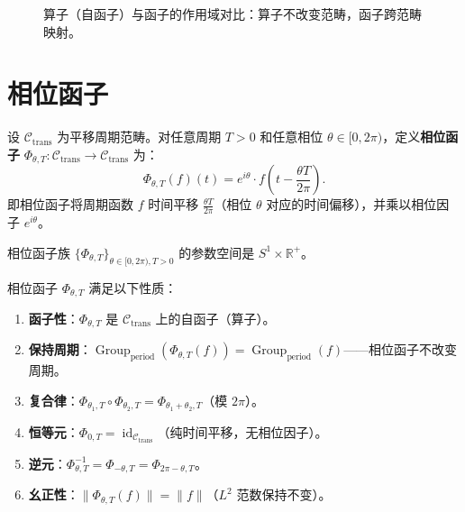 \begin{figure}[htbp]
\centering
{}
\caption{算子（自函子）与函子的作用域对比：算子不改变范畴，函子跨范畴映射。}
\label{fig:operator_vs_functor}
\end{figure}

\section{相位函子}\label{sec:phase_functor}

\begin{definition}[相位函子]\label{def:phase_functor_general}
设 $\mathcal{C}_{\text{trans}}$ 为平移周期范畴。对任意周期 $T > 0$ 和任意相位 $\theta \in [0, 2\pi)$，定义\textbf{相位函子} $\Phi_{\theta, T}: \mathcal{C}_{\text{trans}} \to \mathcal{C}_{\text{trans}}$ 为：
\[
\Phi_{\theta, T}(f)(t) = e^{i\theta} \cdot f\!\left( t - \frac{\theta T}{2\pi} \right).
\]
即相位函子将周期函数 $f$ 时间平移 $\frac{\theta T}{2\pi}$（相位 $\theta$ 对应的时间偏移），并乘以相位因子 $e^{i\theta}$。

相位函子族 $\{\Phi_{\theta, T}\}_{\theta \in [0, 2\pi), T > 0}$ 的参数空间是 $S^1 \times \mathbb{R}^+$。
\end{definition}

\begin{proposition}[相位函子的基本性质]\label{prop:phase_functor_properties}
相位函子 $\Phi_{\theta, T}$ 满足以下性质：
\begin{enumerate}[label=(\roman*)]
    \item \textbf{函子性}：$\Phi_{\theta, T}$ 是 $\mathcal{C}_{\text{trans}}$ 上的自函子（算子）。
    \item \textbf{保持周期}：$\operatorname{Group}_{\mathrm{period}}(\Phi_{\theta, T}(f)) = \operatorname{Group}_{\mathrm{period}}(f)$——相位函子不改变周期。
    \item \textbf{复合律}：$\Phi_{\theta_1, T} \circ \Phi_{\theta_2, T} = \Phi_{\theta_1 + \theta_2, T}$（模 $2\pi$）。
    \item \textbf{恒等元}：$\Phi_{0, T} = \operatorname{id}_{\mathcal{C}_{\text{trans}}}$（纯时间平移，无相位因子）。
    \item \textbf{逆元}：$\Phi_{\theta, T}^{-1} = \Phi_{-\theta, T} = \Phi_{2\pi - \theta, T}$。
    \item \textbf{幺正性}：$\|\Phi_{\theta, T}(f)\| = \|f\|$（$L^2$ 范数保持不变）。
\end{enumerate}
\end{proposition}


